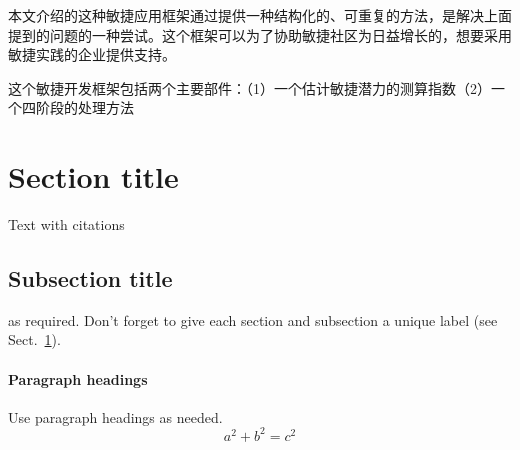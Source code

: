 \documentclass[twocolumn]{svjour3}          %
\begin{document}
本文介绍的这种敏捷应用框架通过提供一种结构化的、可重复的方法，是解决上面提到的问题的一种尝试。这个框架可以为了协助敏捷社区为日益增长的，想要采用敏捷实践的企业提供支持。

这个敏捷开发框架包括两个主要部件：（1）一个估计敏捷潜力的测算指数（2）一个四阶段的处理方法
\section{Section title}
\label{sec:1}
Text with citations 
\subsection{Subsection title}
\label{sec:2}
as required. Don't forget to give each section
and subsection a unique label (see Sect.~\ref{sec:1}).
\paragraph{Paragraph headings} Use paragraph headings as needed.
\begin{equation}
a^2+b^2=c^2
\end{equation}
\end{document}

